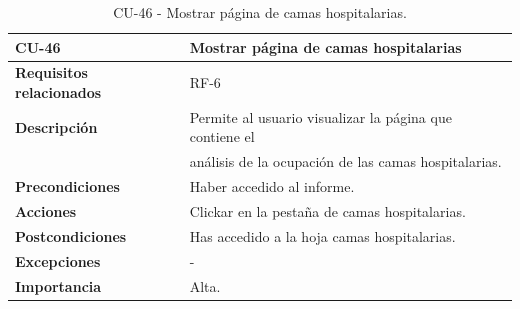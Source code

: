 \begin{table}[ht!]
    \centering
    \resizebox{15cm}{!} {
    \begin{tabular}{|l|l|}
    \hline
         \textbf{CU-46}     &  \textbf{Mostrar página de camas hospitalarias} \\ \hline
         \textbf{Requisitos relacionados}       & RF-6 \\ \hline
         \textbf{Descripción}    & Permite al usuario visualizar la página que contiene el \\&análisis de la ocupación de las camas hospitalarias. \\ \hline   
         \textbf{Precondiciones}      & Haber accedido al informe. \\ \hline
         \textbf{Acciones}      & Clickar en la pestaña de camas hospitalarias. \\ \hline
         \textbf{Postcondiciones}       & Has accedido a la hoja camas hospitalarias. \\ \hline
         \textbf{Excepciones}       & - \\ \hline
         \textbf{Importancia}   & Alta. \\
         \hline
    \end{tabular}}
    \caption{CU-46 - Mostrar página de camas hospitalarias.}
    \label{tab:my_label}
\end{table}
